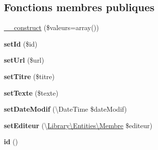 \subsection*{Fonctions membres publiques}
\begin{DoxyCompactItemize}
\item 
\hyperlink{class_library_1_1_entities_1_1_page_fixe_a6a8dd1d972925f6a5e98fadc554f6710}{\+\_\+\+\_\+construct} (\$valeurs=array())
\item 
\hypertarget{class_library_1_1_entities_1_1_page_fixe_a87313ad678fb2a2a8efb435cf0bdb9a0}{{\bfseries set\+Id} (\$id)}\label{class_library_1_1_entities_1_1_page_fixe_a87313ad678fb2a2a8efb435cf0bdb9a0}

\item 
\hypertarget{class_library_1_1_entities_1_1_page_fixe_a0b6d0c531aa70b1811b166299edab8d0}{{\bfseries set\+Url} (\$url)}\label{class_library_1_1_entities_1_1_page_fixe_a0b6d0c531aa70b1811b166299edab8d0}

\item 
\hypertarget{class_library_1_1_entities_1_1_page_fixe_a1d7b0177b6a719345b3a99ec2b48c5a0}{{\bfseries set\+Titre} (\$titre)}\label{class_library_1_1_entities_1_1_page_fixe_a1d7b0177b6a719345b3a99ec2b48c5a0}

\item 
\hypertarget{class_library_1_1_entities_1_1_page_fixe_a77be937e871225b0ec6f0c35b2547008}{{\bfseries set\+Texte} (\$texte)}\label{class_library_1_1_entities_1_1_page_fixe_a77be937e871225b0ec6f0c35b2547008}

\item 
\hypertarget{class_library_1_1_entities_1_1_page_fixe_a8af2dc090962acf2814e5ae0d3fc0db6}{{\bfseries set\+Date\+Modif} (\textbackslash{}Date\+Time \$date\+Modif)}\label{class_library_1_1_entities_1_1_page_fixe_a8af2dc090962acf2814e5ae0d3fc0db6}

\item 
\hypertarget{class_library_1_1_entities_1_1_page_fixe_a30eb9f2c1631e9c510340c89eb60a1c9}{{\bfseries set\+Editeur} (\textbackslash{}\hyperlink{class_library_1_1_entities_1_1_membre}{Library\textbackslash{}\+Entities\textbackslash{}\+Membre} \$editeur)}\label{class_library_1_1_entities_1_1_page_fixe_a30eb9f2c1631e9c510340c89eb60a1c9}

\item 
\hypertarget{class_library_1_1_entities_1_1_page_fixe_a087060b582403885d08e89ad894ecc5d}{{\bfseries id} ()}\label{class_library_1_1_entities_1_1_page_fixe_a087060b582403885d08e89ad894ecc5d}


\end{DoxyCompactItemize}
